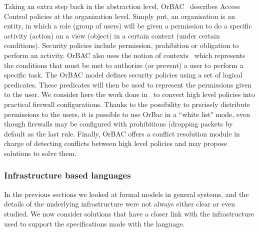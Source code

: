 Taking an extra step back in the abstraction level, OrBAC~\cite{orbac} describes Access Control policies at the organization level. Simply put, an organisation is an entity, in which a role (\ie group of users) will be given a permission to do a specific activity (\ie action) on a view (\ie object) in a certain context (\ie under certain conditions).
Security policies include permission, prohibition or obligation to perform an activity.
OrBAC also uses the notion of contexts~\cite{context-orbac} which represents the conditions that must be met to authorize (or prevent) a user to perform a specific task.
The OrBAC model defines security policies using a set of logical predicates. These predicates will then be used to represent the permissions given to the user.
We consider here the work done in~\cite{Cuppens} to convert high level policies into practical firewall configurations. Thanks to the possibility to precisely distribute permissions to the users, it is possible to use OrBac in a ``white list" mode, even though firewalls may be configured with prohibitions (\ie dropping packets by default as the last rule.
Finally, OrBAC offers a conflict resolution module in charge of detecting conflicts between high level policies and may propose solutions to solve them.

\subsubsection{Infrastructure based languages}
In the previous sections we looked at formal models in general systems, and the details of the underlying infrastructure were not always either clear or even studied. We now consider solutions that have a closer link with the infrastructure used to support the specifications made with the language.

